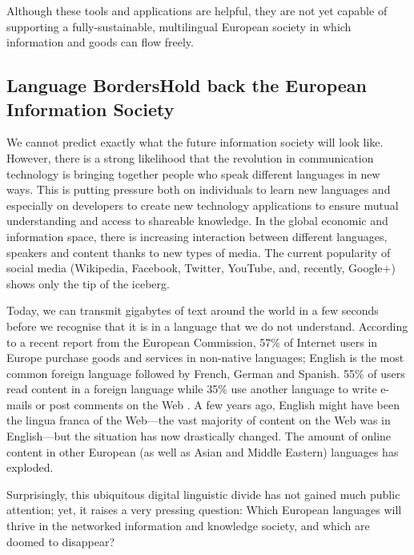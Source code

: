 \begin{multicols}{2}
Although these tools and applications are helpful, they are not yet capable of supporting a fully-sustainable, multilingual European society in which information and goods can flow freely.

\subsection[Language Borders Hold back the European Information Society]{Language Borders\newline Hold back the European Information Society}

We cannot predict exactly what the future information society will look like. However, there is a strong likelihood that the revolution in communication technology is bringing together people who speak different languages in new ways. This is putting pressure both on individuals to learn new languages and especially on developers to create new technology applications to ensure mutual understanding and access to shareable knowledge. In the global economic and information space, there is increasing interaction between different languages, speakers and content thanks to new types of media. The current popularity of social media (Wikipedia, Facebook, Twitter, YouTube, and, recently, Google+) shows only the tip of the iceberg.


Today, we can transmit gigabytes of text around the world in a few seconds before we recognise that it is in a language that we do not understand. According to a recent report from the European Commission, 57\% of Internet users in Europe purchase goods and services in non-native languages; English is the most common foreign language followed by French, German and Spanish. 55\% of users read content in a foreign language while 35\% use another language to write e-mails or post comments on the Web \cite{EC1}. A few years ago, English might have been the lingua franca of the Web—the vast majority of content on the Web was in English—but the situation has now drastically changed. The amount of online content in other European (as well as Asian and Middle Eastern) languages has exploded.

Surprisingly, this ubiquitous digital linguistic divide has not gained much public attention; yet, it raises a very pressing question: Which European languages will thrive in the networked information and knowledge society, and which are doomed to disappear?


\end{multicols}
